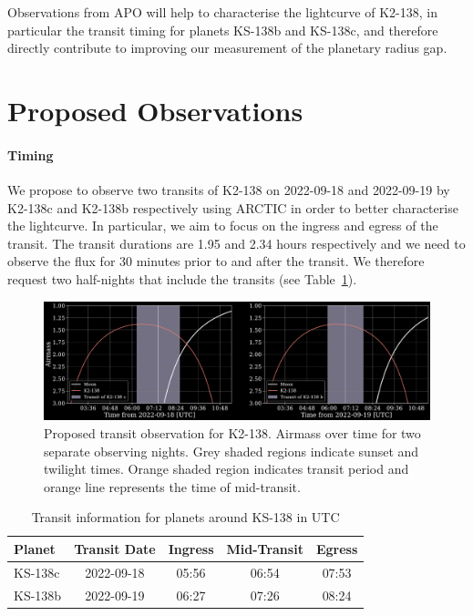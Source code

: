 \documentclass[twocolumn]{aastex631}
\begin{document}
Observations from APO will help to characterise the lightcurve of K2-138, in particular the transit timing for planets KS-138b and KS-138c, and therefore directly contribute to improving our measurement of the planetary radius gap.

\section{Proposed Observations}

\paragraph{Timing} We propose to observe two transits of K2-138 on 2022-09-18 and 2022-09-19 by K2-138c and K2-138b respectively using ARCTIC in order to better characterise the lightcurve. In particular, we aim to focus on the ingress and egress of the transit. The transit durations are 1.95 and 2.34 hours respectively and we need to observe the flux for 30 minutes prior to and after the transit. We therefore request two half-nights that include the transits (see Table~\ref{tab:transits}).

\begin{figure}[htb]
    \includegraphics[width=\columnwidth]{observable_transits.pdf}
    \caption{Proposed transit observation for K2-138. Airmass over time for two separate observing nights. Grey shaded regions indicate sunset and twilight times. Orange shaded region indicates transit period and orange line represents the time of mid-transit.}
\end{figure}

\begin{table}[htb]
    \centering
    \begin{tabular}{l|c|c|c|c} 
        \hline
        Planet & Transit Date & Ingress & Mid-Transit & Egress \\
        \hline\hline
        KS-138c & 2022-09-18 & 05:56 & 06:54 & 07:53 \\
        KS-138b & 2022-09-19 & 06:27 & 07:26 & 08:24 \\
        \hline
    \end{tabular}
    \caption{Transit information for planets around KS-138 in UTC}
    \label{tab:transits}
\end{table}
\end{document}
